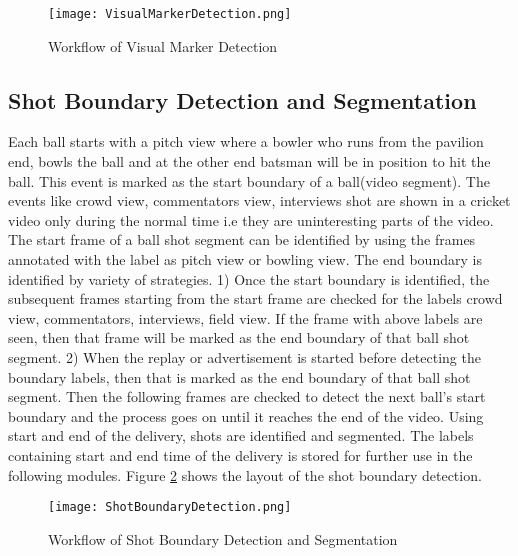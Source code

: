 \begin{figure}[h]
    \centering
   \texttt{[image: VisualMarkerDetection.png]}
    \caption{Workflow of Visual Marker Detection}
    \label{fig:Visual Marker Detection}
\end{figure}

\newpage
\subsection{Shot Boundary Detection and Segmentation}
Each ball starts with a pitch view where a bowler who runs from the pavilion end, bowls the ball and at the other end batsman will be in position to hit the ball. This event is marked as the start boundary of a ball(video segment). The events like crowd view, commentators view, interviews shot are shown in a cricket video only during the normal time i.e they are uninteresting parts of the video. The start frame of a ball shot segment can be identified by using the frames annotated with the label as pitch view or bowling view. The end boundary is identified by variety of strategies. 1) Once the start boundary is identified, the subsequent frames starting from the start frame are checked for the labels crowd view, commentators, interviews, field view. If the frame with above labels are seen, then that frame will be marked as the end boundary of that ball shot segment. 2) When the replay or advertisement is started before detecting the boundary labels, then that is marked as the end boundary of that ball shot segment. Then the following frames are checked to detect the next ball's start boundary and the process goes on until it reaches the end of the video. Using start and end of the delivery, shots are identified and segmented. The labels containing start and end time of the delivery is stored for further use in the following modules. Figure \ref{fig:ShotBoundaryDetection} shows the layout of the shot boundary detection.

\begin{figure}[h]
    \centering
   \texttt{[image: ShotBoundaryDetection.png]}
    \caption{Workflow of Shot Boundary Detection and Segmentation}
    \label{fig:ShotBoundaryDetection}
\end{figure}
\newpage
